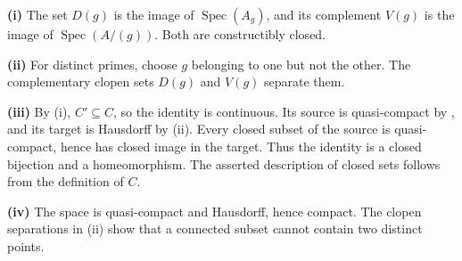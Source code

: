 \textbf{(i)} The set $D(g)$ is the image of $\operatorname{Spec}(A_g)$, and its complement $V(g)$ is the image of $\operatorname{Spec}(A/(g))$. Both are constructibly closed.

\textbf{(ii)} For distinct primes, choose $g$ belonging to one but not the other. The complementary clopen sets $D(g)$ and $V(g)$ separate them.

\textbf{(iii)} By (i), $C'\subseteq C$, so the identity is continuous. Its source is quasi-compact by , and its target is Hausdorff by (ii). Every closed subset of the source is quasi-compact, hence has closed image in the target. Thus the identity is a closed bijection and a homeomorphism. The asserted description of closed sets follows from the definition of $C$.

\textbf{(iv)} The space is quasi-compact and Hausdorff, hence compact. The clopen separations in (ii) show that a connected subset cannot contain two distinct points.
